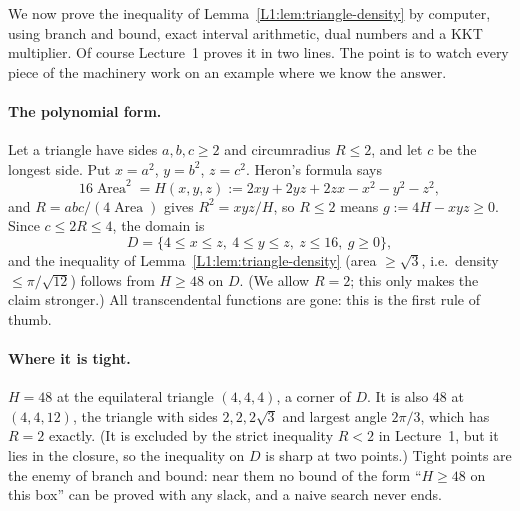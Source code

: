 \documentclass[11pt,openany]{book}
\theoremstyle{plain}
\theoremstyle{definition}
\theoremstyle{remark}
\begin{document}
We now prove the inequality of Lemma~\ref{L1:lem:triangle-density} by computer, using branch and bound, exact interval
arithmetic, dual numbers and a KKT multiplier. Of course Lecture~1 proves it in two lines. The point is to
watch every piece of the machinery work on an example where we know the answer.

\paragraph{The polynomial form.} Let a triangle have sides $a,b,c\ge2$ and circumradius $R\le2$, and let
$c$ be the longest side. Put $x=a^2$, $y=b^2$, $z=c^2$. Heron's formula says
\[
  16\operatorname{Area}^2=H(x,y,z):=2xy+2yz+2zx-x^2-y^2-z^2,
\]
and $R=abc/(4\operatorname{Area})$ gives $R^2=xyz/H$, so $R\le2$ means $g:=4H-xyz\ge0$. Since $c\le2R\le4$,
the domain is
\[
  D=\{4\le x\le z,\ 4\le y\le z,\ z\le16,\ g\ge0\},
\]
and the inequality of Lemma~\ref{L1:lem:triangle-density} (area $\ge\sqrt3$, i.e.\ density
$\le\pi/\sqrt{12}$) follows from $H\ge48$ on $D$. (We allow $R=2$; this only makes the claim stronger.) All transcendental functions are gone: this is
the first rule of thumb.

\paragraph{Where it is tight.} $H=48$ at the equilateral triangle $(4,4,4)$, a corner of $D$. It is also
$48$ at $(4,4,12)$, the triangle with sides $2,2,2\sqrt3$ and largest angle $2\pi/3$, which has $R=2$
exactly. (It is excluded by the strict inequality $R<2$ in Lecture~1, but it lies in the closure, so the
inequality on $D$ is sharp at two points.) Tight points are the enemy of branch and bound: near them no bound
of the form ``$H\ge48$ on this box'' can be proved with any slack, and a naive search never ends.
\end{document}

